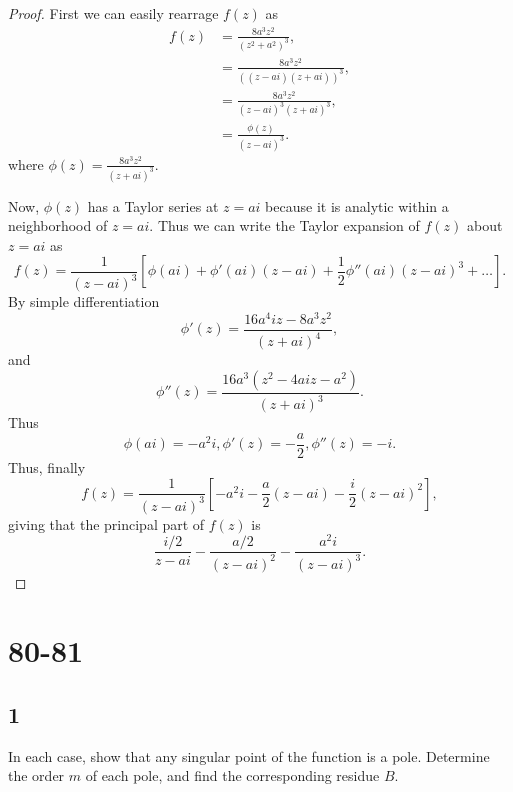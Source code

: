 \documentclass{article}
\begin{document}
\begin{proof}
    First we can easily rearrage $f(z)$ as
    \begin{align*}
        f(z) & = \frac{8a^3z^2}{(z^2 + a^2)^3},        \\
             & = \frac{8a^3z^2}{((z - ai)(z + ai))^3}, \\
             & = \frac{8a^3z^2}{(z-ai)^3(z+ai)^3},     \\
             & = \frac{\phi(z)}{(z - ai)^3}.
    \end{align*}
    where $\phi(z) = \frac{8a^3z^2}{(z+ai)^3}$.

    Now, $\phi(z)$ has a Taylor series at $z = ai$ because it is analytic within
    a neighborhood of $z = ai$. Thus we can write the Taylor expansion of $f(z)$
    about $z = ai$ as
    \begin{equation*}
        f(z) = \frac{1}{(z-ai)^3}\left[\phi(ai) + \phi'(ai)(z-ai)
            + \frac{1}{2}\phi''(ai)(z-ai)^3 + \dots\right].
    \end{equation*}
    By simple differentiation
    \begin{equation*}
        \phi'(z) = \frac{16a^4iz-8a^3z^2}{(z+ai)^4},
    \end{equation*}
    and
    \begin{equation*}
        \phi''(z) = \frac{16a^3(z^2-4aiz-a^2)}{(z+ai)^3}.
    \end{equation*}
    Thus
    \begin{equation*}
        \phi(ai) = -a^2i, \phi'(z) = -\frac{a}{2}, \phi''(z) = -i.
    \end{equation*}
    Thus, finally
    \begin{equation*}
        f(z) = \frac{1}{(z-ai)^3}\left[-a^2i - \frac{a}{2}(z-ai) - \frac{i}{2}(z-ai)^2\right],
    \end{equation*}
    giving that the principal part of $f(z)$ is
    \[\frac{i/2}{z - ai} - \frac{a/2}{(z-ai)^2} - \frac{a^2i}{(z-ai)^3}.\]
\end{proof}

\section*{80-81}
\subsection*{1}
In each case, show that any singular point of the function is a pole.
Determine the order $m$ of each pole, and find the corresponding residue $B$.
\end{document}
